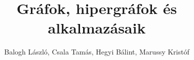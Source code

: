 \newcommand*{\authors}{Szerzők}
\newcommand*{\authori}{Balogh László}
\newcommand*{\authorii}{Csala Tamás}
\newcommand*{\authoriii}{Hegyi Bálint}
\newcommand*{\authoriv}{Marussy Kristóf}

\newcommand*{\lecturer}{Előadó}
\newcommand*{\lectureri}{Dr.~Simonyi Gábor}

\newcommand*{\semester}{2016/2017.~tavaszi félév}

\title{Gráfok, hipergráfok és alkalmazásaik}
\newcommand*{\titlepagetitle}{Gráfok, hipergráfok\\és alkalmazásaik}
\author{\authori, \authorii, \authoriii, \authoriv}



